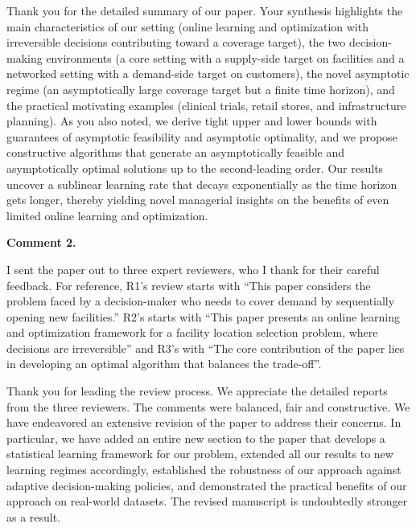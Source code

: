 \documentclass[11pt]{article}
\begin{document}
Thank you for the detailed summary of our paper. Your synthesis highlights the main characteristics of our setting (online learning and optimization with irreversible decisions contributing toward a coverage target), the two decision-making environments (a core setting with a supply-side target on facilities and a networked setting with a demand-side target on customers), the novel asymptotic regime (an asymptotically large coverage target but a finite time horizon), and the practical motivating examples (clinical trials, retail stores, and infrastructure planning). As you also noted, we derive tight upper and lower bounds with guarantees of asymptotic feasibility and asymptotic optimality, and we propose constructive algorithms that generate an asymptotically feasible and asymptotically optimal solutions up to the second-leading order. Our results uncover a sublinear learning rate that decays exponentially as the time horizon gets longer, thereby yielding novel managerial insights on the benefits of even limited online learning and optimization.

\begin{commentBox}
\textbf{Comment 2.}\label{AE:2}

I sent the paper out to three expert reviewers, who I thank for their careful feedback. For reference, R1’s review starts with ``This paper considers the problem faced by a decision-maker who needs to cover demand by sequentially opening new facilities.'' R2’s starts with ``This paper presents an online learning and optimization framework for a facility location selection problem, where decisions are irreversible'' and R3’s with ``The core contribution of the paper lies in developing an optimal algorithm that balances the trade-off''.
\end{commentBox}

Thank you for leading the review process. We appreciate the detailed reports from the three reviewers. The comments were balanced, fair and constructive. We have endeavored an extensive revision of the paper to address their concerns. In particular, we have added an entire new section to the paper that develops a statistical learning framework for our problem, extended all our results to new learning regimes accordingly, established the robustness of our approach against adaptive decision-making policies, and demonstrated the practical benefits of our approach on real-world datasets. The revised manuscript is undoubtedly stronger as a result.
\end{document}
